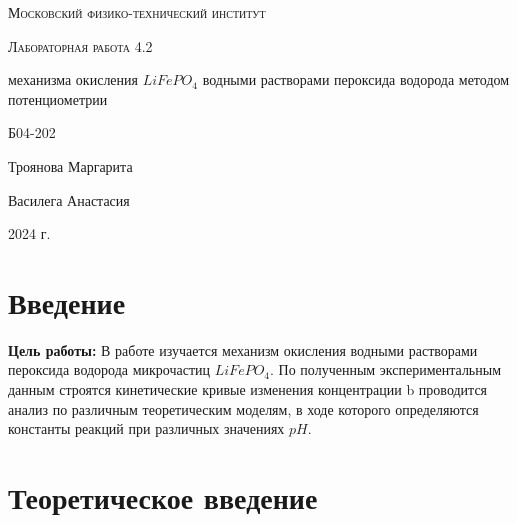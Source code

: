 \documentclass[a4paper,12pt]{article} %
\date{\today}
\begin{document}
\begin{titlepage}
	\centering
	\vspace{5cm}
	{\scshape\LARGE Московский физико-технический институт \par}
	\vspace{4cm}
	{\scshape\Large Лабораторная работа 4.2\par}
	\vspace{1cm}
	{\huge{} механизма окисления $LiFePO_4$ водными растворами пероксида водорода методом потенциометрии}
	\vspace{1cm}
	\vfill
\begin{flushright}
	{\large Б04-202}\par
	\vspace{0.3cm}
	{\LARGE Троянова Маргарита}\par
 {\LARGE Василега Анастасия}\par
\end{flushright}
	

	\vfill

	2024 г.
\end{titlepage}

\section{Введение}
\textbf{Цель работы:} В работе изучается механизм окисления водными растворами пероксида водорода микрочастиц $LiFePO_4$. По полученным экспериментальным данным строятся кинетические кривые изменения концентрации b проводится анализ по различным теоретическим моделям, в ходе которого определяются константы реакций при различных значениях $pH$.
\newline


\section{Теоретическое введение}\par 
\end{document}
